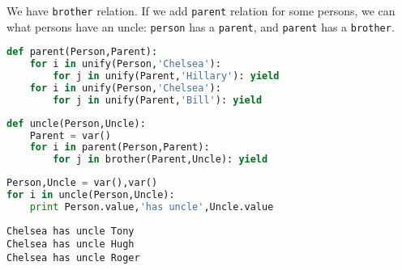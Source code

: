 We have \verb|brother| relation. If we add \verb|parent| relation
for some persons, we can  what persons have an uncle: \verb|person|
has a \verb|parent|, and \verb|parent| has a \verb|brother|.
\begin{lstlisting}[language=Python]
def parent(Person,Parent):
	for i in unify(Person,'Chelsea'):
		for j in unify(Parent,'Hillary'): yield
	for i in unify(Person,'Chelsea'):
		for j in unify(Parent,'Bill'): yield
\end{lstlisting}
\begin{lstlisting}[language=Python]
def uncle(Person,Uncle):
	Parent = var()
	for i in parent(Person,Parent):
		for j in brother(Parent,Uncle): yield
\end{lstlisting}
\begin{lstlisting}[language=Python]
Person,Uncle = var(),var()
for i in uncle(Person,Uncle):
	print Person.value,'has uncle',Uncle.value
\end{lstlisting}
\begin{lstlisting}
Chelsea has uncle Tony
Chelsea has uncle Hugh
Chelsea has uncle Roger
\end{lstlisting}

